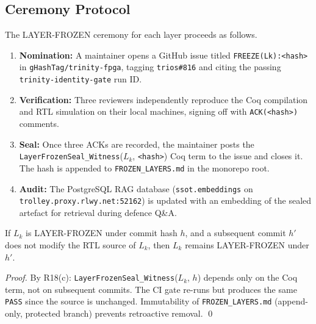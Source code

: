 \subsection{Ceremony Protocol}

The LAYER-FROZEN ceremony for each layer proceeds as follows.
\begin{enumerate}
  \item \textbf{Nomination:} A maintainer opens a GitHub issue titled
        \texttt{FREEZE(Lk):<hash>} in \texttt{gHashTag/trinity-fpga},
        tagging \texttt{trios\#816} and citing the passing
        \texttt{trinity-identity-gate} run ID.
  \item \textbf{Verification:} Three reviewers independently reproduce the Coq
        compilation and RTL simulation on their local machines, signing off with
        \texttt{ACK(<hash>)} comments.
  \item \textbf{Seal:} Once three ACKs are recorded, the maintainer posts the
        \texttt{LayerFrozenSeal\_Witness}(\(L_k\), \texttt{<hash>}) Coq term to
        the issue and closes it.  The hash is appended to
        \texttt{FROZEN\_LAYERS.md} in the monorepo root.
  \item \textbf{Audit:} The PostgreSQL RAG database
        (\texttt{ssot.embeddings} on \texttt{trolley.proxy.rlwy.net:52162})
        is updated with an embedding of the sealed artefact for retrieval during
        defence Q\&A.
\end{enumerate}

\begin{lemma}[R18 Monotonicity]\label{lem:r18-monotone}
If \(L_k\) is LAYER-FROZEN under commit hash \(h\), and a subsequent commit
\(h'\) does not modify the RTL source of \(L_k\), then \(L_k\) remains
LAYER-FROZEN under \(h'\).
\end{lemma}

\begin{proof}
By R18(c): \texttt{LayerFrozenSeal\_Witness}(\(L_k\), \(h\)) depends only on
the Coq term, not on subsequent commits.
The CI gate re-runs but produces the same \texttt{PASS} since the source is
unchanged.
Immutability of \texttt{FROZEN\_LAYERS.md} (append-only, protected branch)
prevents retroactive removal.
\qed
\end{proof}


